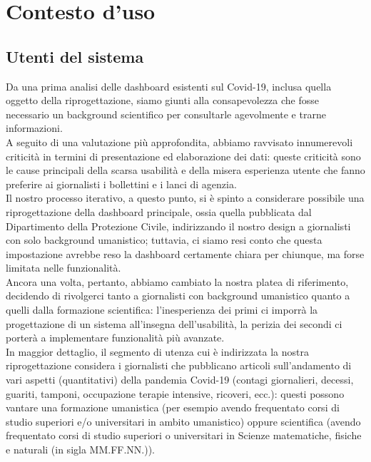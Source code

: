 \section{Contesto d'uso}
\label{s:contesto-uso}
\subsection{Utenti del sistema}
\label{ss:utenti-sistema}
Da una prima analisi delle dashboard esistenti sul Covid-19, inclusa quella oggetto della riprogettazione, siamo giunti alla consapevolezza che fosse necessario un background scientifico per consultarle agevolmente e trarne informazioni.\\
A seguito di una valutazione più approfondita, abbiamo ravvisato innumerevoli criticità in termini di presentazione ed elaborazione dei dati: queste criticità sono le cause principali della scarsa usabilità e della misera esperienza utente che  fanno preferire ai giornalisti i bollettini e i lanci di agenzia.\\
Il nostro processo iterativo, a questo punto, si è spinto a considerare possibile una riprogettazione della dashboard principale, ossia quella pubblicata dal Dipartimento della Protezione Civile, indirizzando il nostro design a giornalisti con solo background umanistico; tuttavia, ci siamo resi conto che questa impostazione avrebbe reso la dashboard certamente chiara per chiunque, ma forse limitata nelle funzionalità.\\ 
Ancora una volta, pertanto, abbiamo cambiato la nostra platea di riferimento, decidendo di rivolgerci tanto a giornalisti con background umanistico quanto a quelli dalla formazione scientifica: l'inesperienza dei primi ci imporrà la progettazione di un sistema all'insegna dell'usabilità, la perizia dei secondi ci porterà a implementare funzionalità più avanzate.\\
In maggior dettaglio, il segmento di utenza cui è indirizzata la nostra riprogettazione considera i giornalisti che pubblicano articoli sull'andamento di vari aspetti (quantitativi) della pandemia Covid-19 (contagi giornalieri, decessi, guariti, tamponi, occupazione terapie intensive, ricoveri, ecc.): questi possono vantare una formazione umanistica (per esempio avendo frequentato corsi di studio superiori e/o universitari in ambito umanistico) oppure scientifica (avendo frequentato corsi di studio superiori o universitari in Scienze matematiche, fisiche e naturali (in sigla MM.FF.NN.)).

